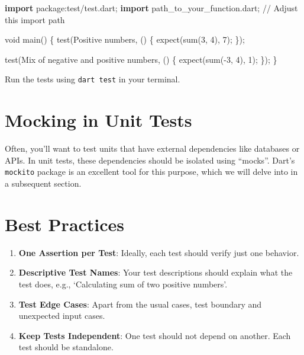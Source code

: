 \documentclass[
]{article}
\newenvironment{Shaded}{\begin{snugshade}}{\end{snugshade}}
\newcommand{\CommentTok}[1]{\textcolor[rgb]{0.48,0.49,0.49}{#1}}
\newcommand{\DataTypeTok}[1]{\textcolor[rgb]{0.16,0.50,0.73}{#1}}
\newcommand{\DecValTok}[1]{\textcolor[rgb]{0.96,0.45,0.00}{#1}}
\newcommand{\KeywordTok}[1]{\textcolor[rgb]{0.81,0.81,0.76}{\textbf{#1}}}
\newcommand{\NormalTok}[1]{\textcolor[rgb]{0.81,0.81,0.76}{#1}}
\newcommand{\OperatorTok}[1]{\textcolor[rgb]{0.81,0.81,0.76}{#1}}
\newcommand{\StringTok}[1]{\textcolor[rgb]{0.96,0.31,0.31}{#1}}
\providecommand{\tightlist}{%
  \setlength{\itemsep}{0pt}\setlength{\parskip}{0pt}}
\begin{document}
\begin{Shaded}
\begin{Highlighting}[]
\KeywordTok{import} \StringTok{\textquotesingle{}package:test/test.dart\textquotesingle{}}\NormalTok{;}
\KeywordTok{import} \StringTok{\textquotesingle{}path\_to\_your\_function.dart\textquotesingle{}}\NormalTok{;  }\CommentTok{// Adjust this import path}

\DataTypeTok{void}\NormalTok{ main() }\OperatorTok{\{}
\NormalTok{  test(}\StringTok{\textquotesingle{}Positive numbers\textquotesingle{}}\OperatorTok{,}\NormalTok{ () }\OperatorTok{\{}
\NormalTok{    expect(sum(}\DecValTok{3}\OperatorTok{,} \DecValTok{4}\NormalTok{)}\OperatorTok{,} \DecValTok{7}\NormalTok{);}
  \OperatorTok{\}}\NormalTok{);}

\NormalTok{  test(}\StringTok{\textquotesingle{}Mix of negative and positive numbers\textquotesingle{}}\OperatorTok{,}\NormalTok{ () }\OperatorTok{\{}
\NormalTok{    expect(sum(}\OperatorTok{{-}}\DecValTok{3}\OperatorTok{,} \DecValTok{4}\NormalTok{)}\OperatorTok{,} \DecValTok{1}\NormalTok{);}
  \OperatorTok{\}}\NormalTok{);}
\OperatorTok{\}}
\end{Highlighting}
\end{Shaded}

Run the tests using \texttt{dart\ test} in your terminal.

\section{Mocking in Unit Tests}\label{mocking-in-unit-tests}

Often, you'll want to test units that have external dependencies like
databases or APIs. In unit tests, these dependencies should be isolated
using ``mocks''. Dart's \texttt{mockito} package is an excellent tool
for this purpose, which we will delve into in a subsequent section.

\section{Best Practices}\label{best-practices}

\begin{enumerate}
\def\labelenumi{\arabic{enumi}.}
\tightlist
\item
  \textbf{One Assertion per Test}: Ideally, each test should verify just
  one behavior.
\item
  \textbf{Descriptive Test Names}: Your test descriptions should explain
  what the test does, e.g., `Calculating sum of two positive numbers'.
\item
  \textbf{Test Edge Cases}: Apart from the usual cases, test boundary
  and unexpected input cases.
\item
  \textbf{Keep Tests Independent}: One test should not depend on
  another. Each test should be standalone.
\end{enumerate}
\end{document}
